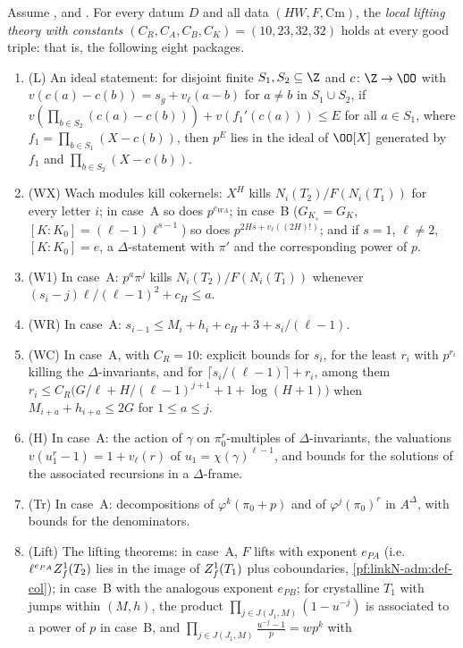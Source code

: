 \begin{theorem}\label{pf:sh-hodge:lc}
Assume \shhodgeBK, \shhodgeLTD{} and \shhodgeLEC. For every datum $D$ and all data $(HW,F,\mathrm{Cm})$, the \emph{local lifting theory with
constants $(C_R,C_A,C_B,C_K)=(10,23,32,32)$} holds at every good triple: that is, the following eight packages.
\begin{enumerate}[label=(\arabic*)]
\item (L) An ideal statement: for disjoint finite $S_1,S_2\subseteq\Z$ and $c\colon\Z\to\OO$ with $v(c(a)-c(b))=s_g+v_\ell(a-b)$ for $a\ne b$ in
  $S_1\cup S_2$, if $v(\prod_{b\in S_2}(c(a)-c(b)))+v(f_1'(c(a)))\le E$ for all $a\in S_1$, where $f_1=\prod_{b\in S_1}(X-c(b))$, then $p^E$ lies in
  the ideal of $\OO[X]$ generated by $f_1$ and $\prod_{b\in S_2}(X-c(b))$.
\item (WX) Wach modules kill cokernels: $X^H$ kills $N_i(T_2)/F(N_i(T_1))$ for every letter $i$; in case~A so does $p^{e_{WA}}$; in case~B
  ($G_{K_s}=G_K$, $[K:K_0]=(\ell-1)\ell^{s-1}$) so does $p^{2Hs+v_\ell((2H)!)}$; and if $s=1$, $\ell\ne2$, $[K:K_0]=e$, a $\Delta$-statement with
  $\pi'$ and the corresponding power of $p$.
\item (W1) In case~A: $p^a\pi^j$ kills $N_i(T_2)/F(N_i(T_1))$ whenever $(s_i-j)\ell/(\ell-1)^2+c_H\le a$.
\item (WR) In case~A: $s_{i-1}\le M_i+h_i+c_H+3+s_i/(\ell-1)$.
\item (WC) In case~A, with $C_R=10$: explicit bounds for $s_i$, for the least $r_i$ with $p^{r_i}$ killing the $\Delta$-invariants, and for
  $\lceil s_i/(\ell-1)\rceil+r_i$, among them $r_i\le C_R\bigl(G/\ell+H/(\ell-1)^{j+1}+1+\log(H+1)\bigr)$ when $M_{i+a}+h_{i+a}\le2G$ for
  $1\le a\le j$.
\item (H) In case~A: the action of $\gamma$ on $\pi_0^r$-multiples of $\Delta$-invariants, the valuations $v(u_1^r-1)=1+v_\ell(r)$ of
  $u_1=\chi(\gamma)^{\ell-1}$, and bounds for the solutions of the associated recursions in a $\Delta$-frame.
\item (Tr) In case~A: decompositions of $\varphi^k(\pi_0+p)$ and of $\varphi^j(\pi_0)^r$ in $A^\Delta$, with bounds for the denominators.
\item (Lift) The lifting theorems: in case~A, $F$ lifts with exponent $e_{PA}$ (i.e.\ $\ell^{e_{PA}}Z^1_{f}(T_2)$ lies in the image of $Z^1_{f}(T_1)$
  plus coboundaries, \cref{pf:linkN-adm:def-col}); in case~B with the analogous exponent $e_{PB}$; for crystalline $T_1$ with jumps within $(M,h)$,
  the product $\prod_{j\in J(J_1,M)}(1-u^{-j})$ is associated to a power of $p$ in case~B, and $\prod_{j\in J(J_1,M)}\frac{u^{-j}-1}{p}=wp^k$ with

\end{enumerate}
\end{theorem}
